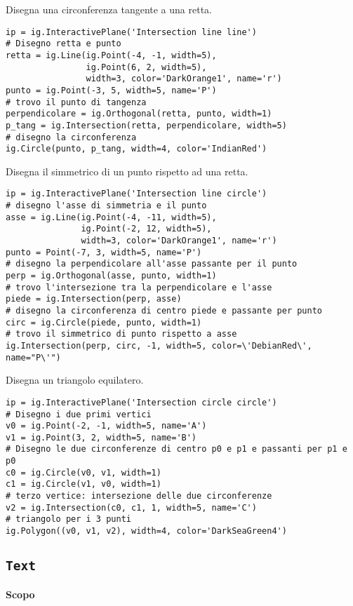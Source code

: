 Disegna una circonferenza tangente a una retta.

\begin{lstlisting}
ip = ig.InteractivePlane('Intersection line line')
# Disegno retta e punto
retta = ig.Line(ig.Point(-4, -1, width=5), 
                ig.Point(6, 2, width=5), 
                width=3, color='DarkOrange1', name='r')
punto = ig.Point(-3, 5, width=5, name='P')
# trovo il punto di tangenza
perpendicolare = ig.Orthogonal(retta, punto, width=1)
p_tang = ig.Intersection(retta, perpendicolare, width=5)
# disegno la circonferenza
ig.Circle(punto, p_tang, width=4, color='IndianRed')
\end{lstlisting}

Disegna il simmetrico di un punto rispetto ad una retta.

\begin{lstlisting}
ip = ig.InteractivePlane('Intersection line circle')
# disegno l'asse di simmetria e il punto
asse = ig.Line(ig.Point(-4, -11, width=5), 
               ig.Point(-2, 12, width=5), 
               width=3, color='DarkOrange1', name='r')
punto = Point(-7, 3, width=5, name='P')
# disegno la perpendicolare all'asse passante per il punto
perp = ig.Orthogonal(asse, punto, width=1)
# trovo l'intersezione tra la perpendicolare e l'asse
piede = ig.Intersection(perp, asse)
# disegno la circonferenza di centro piede e passante per punto
circ = ig.Circle(piede, punto, width=1)
# trovo il simmetrico di punto rispetto a asse
ig.Intersection(perp, circ, -1, width=5, color=\'DebianRed\', name="P\'")
\end{lstlisting}

Disegna un triangolo equilatero.

\begin{lstlisting}
ip = ig.InteractivePlane('Intersection circle circle')
# Disegno i due primi vertici
v0 = ig.Point(-2, -1, width=5, name='A')
v1 = ig.Point(3, 2, width=5, name='B')
# Disegno le due circonferenze di centro p0 e p1 e passanti per p1 e p0
c0 = ig.Circle(v0, v1, width=1)
c1 = ig.Circle(v1, v0, width=1)
# terzo vertice: intersezione delle due circonferenze
v2 = ig.Intersection(c0, c1, 1, width=5, name='C')
# triangolo per i 3 punti
ig.Polygon((v0, v1, v2), width=4, color='DarkSeaGreen4')
\end{lstlisting}

\subsection{\texttt{Text}}
\label{sub:geoint_text}
\textbf{Scopo}

